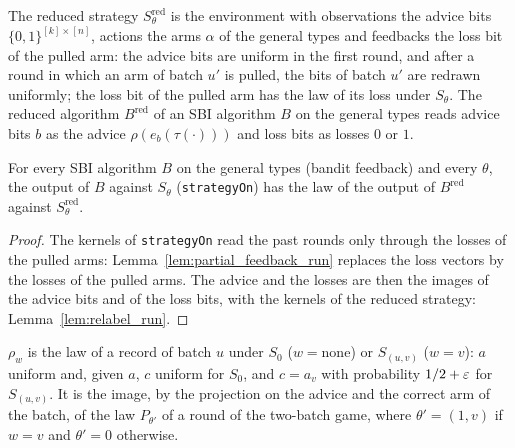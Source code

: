 \begin{definition}
  \label{def:reduced_setting}
  \leanok
  The reduced strategy $S^{\mathrm{red}}_\theta$ is the environment with observations the advice
  bits $\{0,1\}^{[k] \times [n]}$, actions the arms $\alpha$ of the general types and feedbacks the
  loss bit of the pulled arm: the advice bits are uniform in the first round, and after a round in
  which an arm of batch $u'$ is pulled, the bits of batch $u'$ are redrawn uniformly; the loss bit
  of the pulled arm has the law of its loss under $S_\theta$. The reduced algorithm
  $B^{\mathrm{red}}$ of an SBI algorithm $B$ on the general types reads advice bits $b$ as the
  advice $\rho(e_b(\tau(\cdot)))$ and loss bits as losses $0$ or $1$.
\end{definition}

\begin{lemma}
  \label{lem:algorithm_realization}
  \leanok
  For every SBI algorithm $B$ on the general types (bandit feedback) and every $\theta$, the output
  of $B$ against $S_\theta$ (\texttt{strategyOn}) has the law of the output of $B^{\mathrm{red}}$
  against $S^{\mathrm{red}}_\theta$.
\end{lemma}

\begin{proof}
  \leanok
  The kernels of \texttt{strategyOn} read the past rounds only through the losses of the pulled
  arms: Lemma~\ref{lem:partial_feedback_run} replaces the loss vectors by the losses of the pulled
  arms. The advice and the losses are then the images of the advice bits and of the loss bits, with
  the kernels of the reduced strategy: Lemma~\ref{lem:relabel_run}.
\end{proof}

\begin{definition}
  \label{def:record}
  \leanok
  $\rho_w$ is the law of a record of batch $u$ under $S_0$ ($w = \mathrm{none}$) or $S_{(u, v)}$
  ($w = v$): $a$ uniform and, given $a$, $c$ uniform for $S_0$, and $c = a_v$ with probability
  $1/2 + \varepsilon$ for $S_{(u, v)}$. It is the image, by the projection on the advice and the correct
  arm of the batch, of the law $P_{\theta'}$ of a round of the two-batch game, where
  $\theta' = (1, v)$ if $w = v$ and $\theta' = 0$ otherwise.
\end{definition}


